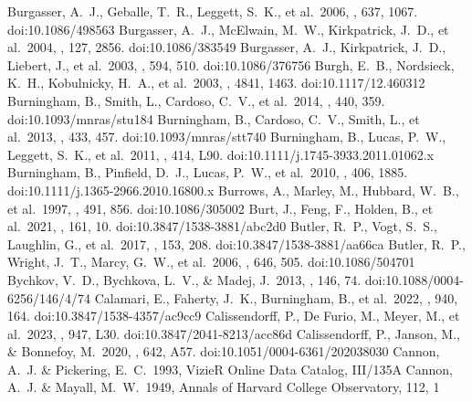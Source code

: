 \documentclass[twocolumn,tighten,twocolappendix]{aastex631}
\begin{document}
\begin{thebibliography}{}
 Burgasser, A.~J., Geballe, T.~R., Leggett, S.~K., et al.\ 2006, \apj, 637, 1067. doi:10.1086/498563
 Burgasser, A.~J., McElwain, M.~W., Kirkpatrick, J.~D., et al.\ 2004, \aj, 127, 2856. doi:10.1086/383549
 Burgasser, A.~J., Kirkpatrick, J.~D., Liebert, J., et al.\ 2003, \apj, 594, 510. doi:10.1086/376756
 Burgh, E.~B., Nordsieck, K.~H., Kobulnicky, H.~A., et al.\ 2003, \procspie, 4841, 1463. doi:10.1117/12.460312
 Burningham, B., Smith, L., Cardoso, C.~V., et al.\ 2014, \mnras, 440, 359. doi:10.1093/mnras/stu184
 Burningham, B., Cardoso, C.~V., Smith, L., et al.\ 2013, \mnras, 433, 457. doi:10.1093/mnras/stt740
 Burningham, B., Lucas, P.~W., Leggett, S.~K., et al.\ 2011, \mnras, 414, L90. doi:10.1111/j.1745-3933.2011.01062.x
 Burningham, B., Pinfield, D.~J., Lucas, P.~W., et al.\ 2010, \mnras, 406, 1885. doi:10.1111/j.1365-2966.2010.16800.x
 Burrows, A., Marley, M., Hubbard, W.~B., et al.\ 1997, \apj, 491, 856. doi:10.1086/305002
 Burt, J., Feng, F., Holden, B., et al.\ 2021, \aj, 161, 10. doi:10.3847/1538-3881/abc2d0
 Butler, R.~P., Vogt, S.~S., Laughlin, G., et al.\ 2017, \aj, 153, 208. doi:10.3847/1538-3881/aa66ca
 Butler, R.~P., Wright, J.~T., Marcy, G.~W., et al.\ 2006, \apj, 646, 505. doi:10.1086/504701
 Bychkov, V.~D., Bychkova, L.~V., \& Madej, J.\ 2013, \aj, 146, 74. doi:10.1088/0004-6256/146/4/74
 Calamari, E., Faherty, J.~K., Burningham, B., et al.\ 2022, \apj, 940, 164. doi:10.3847/1538-4357/ac9cc9
 Calissendorff, P., De Furio, M., Meyer, M., et al.\ 2023, \apjl, 947, L30. doi:10.3847/2041-8213/acc86d
 Calissendorff, P., Janson, M., \& Bonnefoy, M.\ 2020, \aap, 642, A57. doi:10.1051/0004-6361/202038030
 Cannon, A.~J. \& Pickering, E.~C.\ 1993, VizieR Online Data Catalog, III/135A
 Cannon, A.~J. \& Mayall, M.~W.\ 1949, Annals of Harvard College Observatory, 112, 1

\end{thebibliography}
\end{document}
